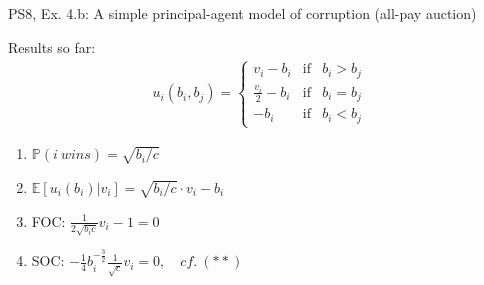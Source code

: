 \begin{frame}{PS8, Ex. 4.b: A simple principal-agent model of corruption (all-pay auction)}
\begin{multicols}{2}
      Results so far: \vspace{-6pt}
      \begin{align*}
        u_i(b_i,b_j)=\left\{\begin{array}{lcl}
          v_i-b_i           & \text{if} & b_i>b_j \\
          \frac{v_i}{2}-b_i & \text{if} & b_i=b_j \\
          -b_i              & \text{if} & b_i<b_j
        \end{array}\right.
      \end{align*} \vspace{-16pt}
      \begin{enumerate}
        \item $\mathbb{P}(i\ wins)=\sqrt{b_i/c}$
        \item $\mathbb{E}[u_i(b_i)|v_i]=\sqrt{b_i/c}\cdot v_i-b_i$
        \item FOC: $\frac{1}{2\sqrt{b_ic}}v_i-1=0$
        \item[] SOC: $-\frac{1}{4}b_i^{-\frac{3}{2}}\frac{1}{\sqrt{c}}v_i=0,\quad cf.\ (**)$
      \end{enumerate}
      \vfill\null
    \end{multicols}
\end{frame}
